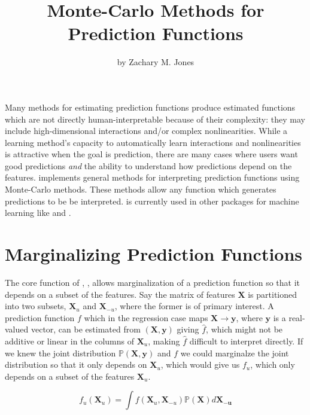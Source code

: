 \title{Monte-Carlo Methods for Prediction Functions}
\author{by Zachary M. Jones}

\maketitle


Many methods for estimating prediction functions produce estimated functions which are not directly human-interpretable because of their complexity: they may include high-dimensional interactions and/or complex nonlinearities. While a learning method's capacity to automatically learn interactions and nonlinearities is attractive when the goal is prediction, there are many cases where users want good predictions \textit{and} the ability to understand how predictions depend on the features.  implements general methods for interpreting prediction functions using Monte-Carlo methods. These methods allow any function which generates predictions to be be interpreted.  is currently used in other packages for machine learning like  and  \citep{jones2016,JMLR:v17:15-066}.

\section{Marginalizing Prediction Functions}

The core function of , , allows marginalization of a prediction function so that it depends on a subset of the features. Say the matrix of features $\mathbf{X}$ is partitioned into two subsets, $\mathbf{X}_u$ and $\mathbf{X}_{-u}$, where the former is of primary interest. A prediction function $f$ which in the regression case maps $\mathbf{X} \rightarrow \mathbf{y}$, where $\mathbf{y}$ is a real-valued vector, can be estimated from $(\mathbf{X}, \mathbf{y})$ giving $\hat{f}$, which might not be additive or linear in the columns of $\mathbf{X}_u$, making $\hat{f}$ difficult to interpret directly. If we knew the joint distribution $\mathbb{P}(\mathbf{X}, \mathbf{y})$ and $f$ we could marginalze the joint distribution so that it only depends on $\mathbf{X}_u$, which would give us $f_u$, which only depends on a subset of the features $\mathbf{X}_u$.

$$f_u (\mathbf{X}_u) = \int f(\mathbf{X}_u, \mathbf{X}_{-u}) \mathbb{P}(\mathbf{X}) d \mathbf{X_{-u}}$$


